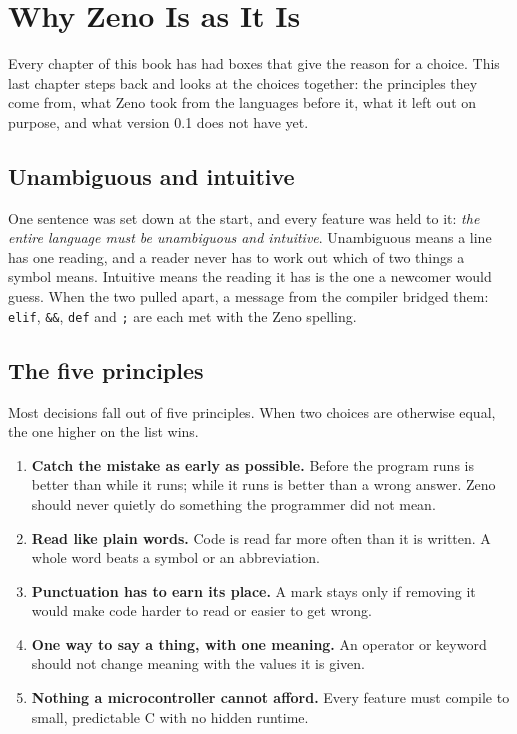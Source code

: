 \chapter{Why Zeno Is as It Is}\label{ch-design}

Every chapter of this book has had boxes that give the reason for a
choice. This last chapter steps back and looks at the choices
together: the principles they come from, what Zeno took from the
languages before it, what it left out on purpose, and what version 0.1
does not have yet.

\section{Unambiguous and intuitive}

One sentence was set down at the start, and every feature was held to
it: \emph{the entire language must be unambiguous and intuitive}.
Unambiguous means a line has one reading, and a reader never has to
work out which of two things a symbol means. Intuitive means the
reading it has is the one a newcomer would guess. When the two pulled
apart, a message from the compiler bridged them: \verb|elif|,
\verb|&&|, \verb|def| and \verb|;| are each met with the Zeno spelling.

\section{The five principles}

Most decisions fall out of five principles. When two choices are
otherwise equal, the one higher on the list wins.

\begin{enumerate}
\item \textbf{Catch the mistake as early as possible.} Before the
  program runs is better than while it runs; while it runs is better
  than a wrong answer. Zeno should never quietly do something the
  programmer did not mean.
\item \textbf{Read like plain words.} Code is read far more often than
  it is written. A whole word beats a symbol or an abbreviation.
\item \textbf{Punctuation has to earn its place.} A mark stays only if
  removing it would make code harder to read or easier to get wrong.
\item \textbf{One way to say a thing, with one meaning.} An operator or
  keyword should not change meaning with the values it is given.
\item \textbf{Nothing a microcontroller cannot afford.} Every feature
  must compile to small, predictable C with no hidden runtime.
\end{enumerate}

